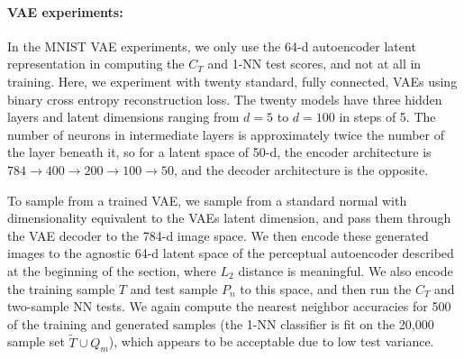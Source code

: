 \paragraph{VAE experiments:}
\label{sec:appendix VAE experiments}
In the MNIST VAE experiments, we only use the 64-d autoencoder latent representation in computing the $C_T$ and 1-NN test scores, and not at all in training. Here, we experiment with twenty standard, fully connected, VAEs using binary cross entropy reconstruction loss. The twenty models have three hidden layers and latent dimensions ranging from $d = 5$ to $d = 100$ in steps of 5. The number of neurons in intermediate layers is approximately twice the number of the layer beneath it, so for a latent space of 50-d, the encoder architecture is $784 \rightarrow 400 \rightarrow 200 \rightarrow 100 \rightarrow 50$, and the decoder architecture is the opposite. 

To sample from a trained VAE, we sample from a standard normal with dimensionality equivalent to the VAEs latent dimension, and pass them through the VAE decoder to the 784-d image space. We then encode these generated images to the agnostic 64-d latent space of the perceptual autoencoder described at the beginning of the section, where $L_2$ distance is meaningful. We also encode the training sample $T$ and test sample $P_n$ to this space, and then run the $C_T$ and two-sample NN tests. We again compute the nearest neighbor accuracies for 500 of the training and generated samples (the 1-NN classifier is fit on the 20,000 sample set $\widetilde{T} \cup Q_m$), which appears to be acceptable due to low test variance. 

